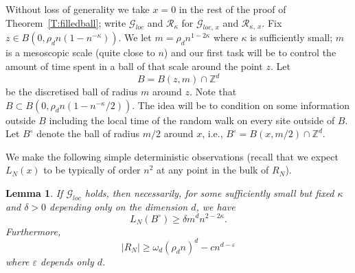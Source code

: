 \documentclass[10pt]{amsart}
\newtheorem{lemm}[theo]{Lemma}\newtheorem{prop}[theo]{Proposition}\newtheorem{coro}[theo]{Corollary}\newtheorem{conj}[theo]{Conjecture}
\theoremstyle{definition}\newtheorem{defi}[theo]{Definition}\newtheorem{rema}[theo]{Remark}\newtheorem{exam}[theo]{Example}\newtheorem{exem}[theo]{Example}\newtheorem{nota}[theo]{Notation}
\newcommand*\Z {{\mathbb Z}}
\newcommand{\cG}{\mathcal{G}}
\newcommand{\cR}{\mathcal{R}}
\newcommand*\eps{\varepsilon}
\begin{document}
Without loss of generality we take $x = 0$ in the rest of the proof of Theorem~\ref{T:filledball}; write $\cG_{loc}$ and $\cR_\kappa$ for $\cG_{loc,\,x}$ and $\cR_{\kappa,\,x}$. Fix $z \in B(0, \rho_d n(1- n^{ - \kappa}))$. We let $m = \rho_d n^{1- 2\kappa}$ where $\kappa$ is sufficiently small; $m$ is a mesoscopic scale (quite close to $n$) and our first task will be to control the amount of time spent in a ball of that scale around the point $z$. Let
\[
B = B(z, m) \cap \Z^d
\]
be the discretised ball of radius $m$ around $z$. Note that $B \subset B(0, \rho_d n(1- n^{-\kappa}/2))$. The idea will be to condition on some information outside $B$ including the local time of the random walk on every site outside of $B$. Let $B^\circ$ denote the ball of radius $m/2$ around $x$, i.e., $B^\circ = B(x, m/2) \cap \Z^d$.

We make the following simple deterministic observations (recall that we expect $L_N(x)$ to be typically of order $n^2$ at any point in the bulk of $R_N$).

\begin{lemm}\label{L:det_time}
If $\cG_{loc}$ holds, then necessarily, for some sufficiently small but fixed $\kappa$ and $\delta>0$ depending only on the dimension $d$, we have
\begin{equation}\label{timeBcirc}
L_N(B^\circ) \ge \delta m^dn^{2- 2\kappa}.
\end{equation}
Furthermore,
\begin{equation}\label{range_det}
|R_N| \ge \omega_d(\rho_d n)^{d} - c n^{d-\eps}
\end{equation}
where $\eps$ depends only $d$.
\end{lemm}
\end{document}
